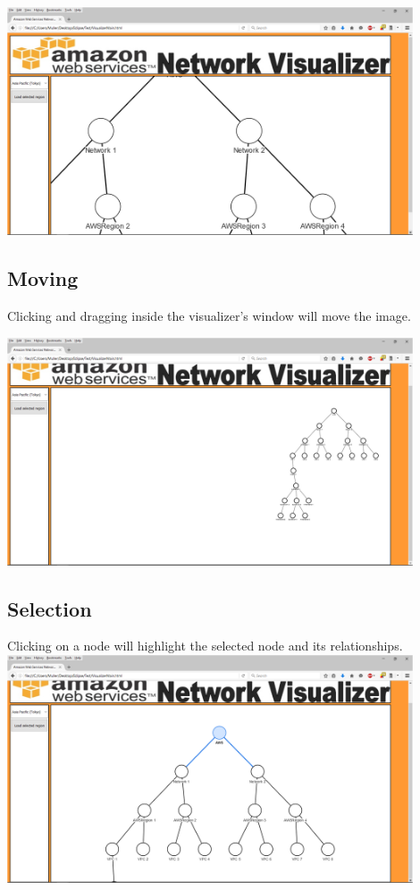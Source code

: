 \documentclass[hidelinks,a4paper,12pt]{article}
\begin{document}
	\includegraphics[width=0.9\textwidth]{./images/Visualizer9.png}
	\newpage

	\subsection{Moving}
	Clicking and dragging inside the visualizer's window will move the image.
	
	\includegraphics[width=0.9\textwidth]{./images/Visualizer10.png}

	\subsection{Selection}
	Clicking on a node will highlight the selected node and its relationships.
	\newline
		\includegraphics[width=0.9\textwidth]{./images/Visualizer7.png}
		
\end{document}
